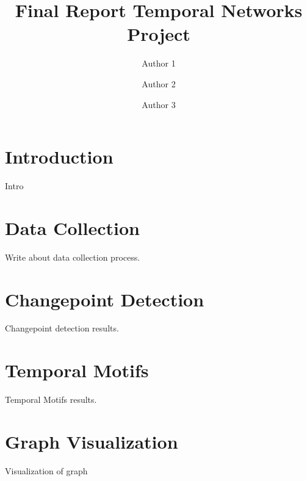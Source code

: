 \documentclass[9pt,twocolumn,twoside,lineno]{pnas-new}
\title{Final Report Temporal Networks Project}
\author{Author 1}
\author{Author 2}
\author{Author 3}
\begin{document}
\verticaladjustment{-2pt}

\maketitle
\thispagestyle{firststyle}

\section{Introduction}
Intro

\section{Data Collection}
Write about data collection process.

\section{Changepoint Detection}
Changepoint detection results.


\section{Temporal Motifs }
Temporal Motifs results.


\section{Graph Visualization }
Visualization of graph



\end{document}
